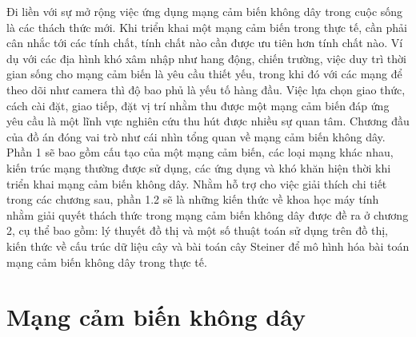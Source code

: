 \linebreak 
Đi liền với sự mở rộng việc ứng dụng mạng cảm biến không dây trong cuộc sống là các thách thức mới. Khi triển khai một mạng cảm biến trong thực tế, cần phải cân nhắc tới các tính chất, tính chất nào cần được ưu tiên hơn tính chất nào. Ví dụ với các địa hình khó xâm nhập như hang động, chiến trường, việc duy trì thời gian sống cho mạng cảm biến là yêu cầu thiết yếu, trong khi đó với các mạng để theo dõi như camera thì độ bao phủ là yếu tố hàng đầu. Việc lựa chọn giao thức, cách cài đặt, giao tiếp, đặt vị trí nhằm thu được một mạng cảm biến đáp ứng yêu cầu là một lĩnh vực nghiên cứu thu hút được nhiều sự quan tâm.
\linebreak 
Chương đầu của đồ án đóng vai trò như cái nhìn tổng quan về mạng cảm biến không dây. Phần 1 sẽ bao gồm cấu tạo của một mạng cảm biến, các loại mạng khác nhau, kiến trúc mạng thường được sử dụng, các ứng dụng và khó khăn hiện thời khi triển khai mạng cảm biến không dây. Nhằm hỗ trợ cho việc giải thích chi tiết trong các chương sau, phần 1.2 sẽ là những kiến thức về khoa học máy tính nhằm giải quyết thách thức trong mạng cảm biến không dây được đề ra ở chương 2, cụ thể bao gồm: lý thuyết đồ thị và một số thuật toán sử dụng trên đồ thị, kiến thức về cấu trúc dữ liệu cây và bài toán cây Steiner để mô hình hóa bài toán mạng cảm biến không dây trong thực tế.

\section{Mạng cảm biến không dây}

